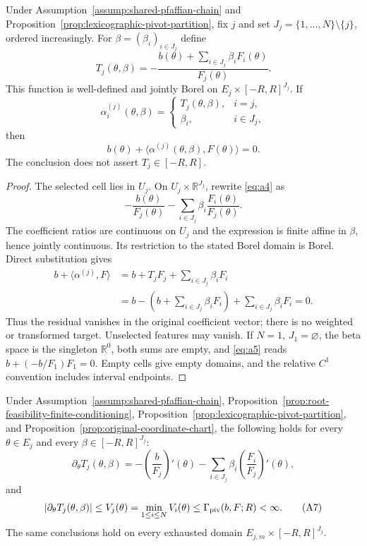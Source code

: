 \begin{proposition}
\label{prop:original-coordinate-chart}
Under Assumption~\ref{assump:shared-pfaffian-chain} and
Proposition~\ref{prop:lexicographic-pivot-partition}, fix $j$ and set
$J_j=\{1,\ldots,N\}\setminus\{j\}$, ordered increasingly.  For
$\beta=(\beta_i)_{i\in J_j}$ define
\[
T_j(\theta,\beta)
=-\frac{b(\theta)+\sum_{i\in J_j}\beta_iF_i(\theta)}{F_j(\theta)}.
\tag{A4}\label{eq:a4}
\]
This function is well-defined and jointly Borel on
$E_j\times[-R,R]^{J_j}$.  If
\[
\alpha_i^{(j)}(\theta,\beta)=
\begin{cases}
T_j(\theta,\beta),&i=j,\\
\beta_i,&i\in J_j,
\end{cases}
\]
then
\[
b(\theta)+\langle\alpha^{(j)}(\theta,\beta),F(\theta)\rangle=0.
\tag{A5}\label{eq:a5}
\]
The conclusion does not assert $T_j\in[-R,R]$.
\end{proposition}

\begin{proof}
The selected cell lies in $U_j$.  On
$U_j\times\mathbb R^{J_j}$, rewrite \eqref{eq:a4} as
\[
-\frac{b(\theta)}{F_j(\theta)}
-\sum_{i\in J_j}\beta_i\frac{F_i(\theta)}{F_j(\theta)}.
\]
The coefficient ratios are continuous on $U_j$ and the expression is
finite affine in $\beta$, hence jointly continuous.  Its restriction to
the stated Borel domain is Borel.  Direct substitution gives
\[
\begin{aligned}
b+\langle\alpha^{(j)},F\rangle
&=b+T_jF_j+\sum_{i\in J_j}\beta_iF_i\\
&=b-\left(b+\sum_{i\in J_j}\beta_iF_i\right)
 +\sum_{i\in J_j}\beta_iF_i=0.
\end{aligned}
\]
Thus the residual vanishes in the original coefficient vector; there is no
weighted or transformed target.  Unselected features may vanish.  If
$N=1$, $J_1=\varnothing$, the beta space is the singleton
$\mathbb R^0$, both sums are empty, and \eqref{eq:a5} reads
$b+(-b/F_1)F_1=0$.  Empty cells give empty domains, and the relative $C^1$
convention includes interval endpoints.
\end{proof}

\begin{proposition}
\label{prop:selected-chart-velocity}
Under Assumption~\ref{assump:shared-pfaffian-chain},
Proposition~\ref{prop:root-feasibility-finite-conditioning},
Proposition~\ref{prop:lexicographic-pivot-partition}, and
Proposition~\ref{prop:original-coordinate-chart}, the following holds for
every $\theta\in E_j$ and every $\beta\in[-R,R]^{J_j}$:
\[
\partial_\theta T_j(\theta,\beta)
=-\left(\frac b{F_j}\right)'(\theta)
-\sum_{i\in J_j}\beta_i
 \left(\frac{F_i}{F_j}\right)'(\theta),
\tag{A6}\label{eq:a6}
\]
and
\[
|\partial_\theta T_j(\theta,\beta)|
\leq V_j(\theta)
=\min_{1\leq i\leq N}V_i(\theta)
\leq\Gamma_{\rm piv}(b,F;R)<\infty.
\tag{A7}\label{eq:a7}
\]
The same conclusions hold on every exhausted domain
$E_{j,m}\times[-R,R]^{J_j}$.
\end{proposition}

